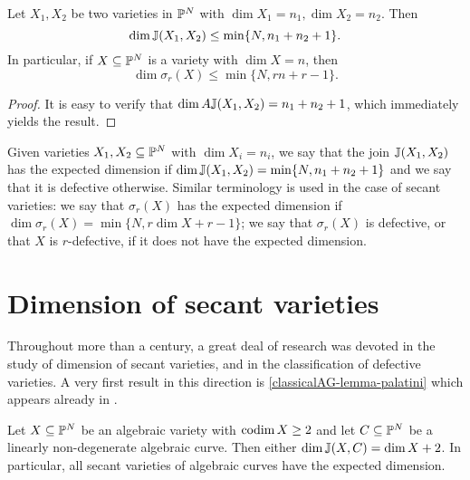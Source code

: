 \begin{lemma}
\label{classicalAG-lemma-expecteddimension}
Let $X_1,X_2$ be two varieties in $\mathbb{P}^N$ with $\dim X_1 = n_1, \dim X_2 = n_2$. Then 
\[
\dim \mathbb{J}(X_1,X_2) \leq \min\{ N, n_1 + n_2 + 1\}.
\]
In particular, if $X \subseteq \mathbb{P}^N$ is a variety with $\dim X = n$, then 
\[
\dim \sigma_r(X) \leq \min\{ N , rn + r-1\}.
\]
\end{lemma}
\begin{proof}
It is easy to verify that $\dim A \mathbb{J}(X_1,X_2) =  n_1 + n_2 + 1$, which immediately yields the result.
\end{proof}
Given varieties $X_1,X_2 \subseteq \mathbb{P}^N$ with $\dim X_i = n_i$, we say that the join $\mathbb{J}(X_1,X_2)$ has the expected dimension if $\dim \mathbb{J}(X_1,X_2) =  \min\{ N, n_1 + n_2 + 1\}$ and we say that it is defective otherwise. Similar terminology is used in the case of secant varieties: we say that $\sigma_r(X)$ has the expected dimension if $\dim \sigma_r(X) = \min\{ N , r \dim X + r-1\}$; we say that $\sigma_r(X)$ is defective, or that $X$ is $r$-defective, if it does not have the expected dimension. 

\section{Dimension of secant varieties}
\label{classicalAG-section-dimension}

Throughout more than a century, a great deal of research was devoted in the study of dimension of secant varieties, and in the classification of defective varieties. A very first result in this direction is \ref{classicalAG-lemma-palatini} which appears already in \cite{Pal09}. 

\begin{lemma}
\label{classicalAG-lemma-palatini}
Let $X \subseteq \mathbb{P}^N$ be an algebraic variety with $\operatorname{codim} X \geq 2$ and let $C \subseteq \mathbb{P}^N$ be a linearly non-degenerate algebraic curve. Then either $\dim \mathbb{J}(X,C) = \dim X + 2$. In particular, all secant varieties of algebraic curves have the expected dimension.
\end{lemma}


